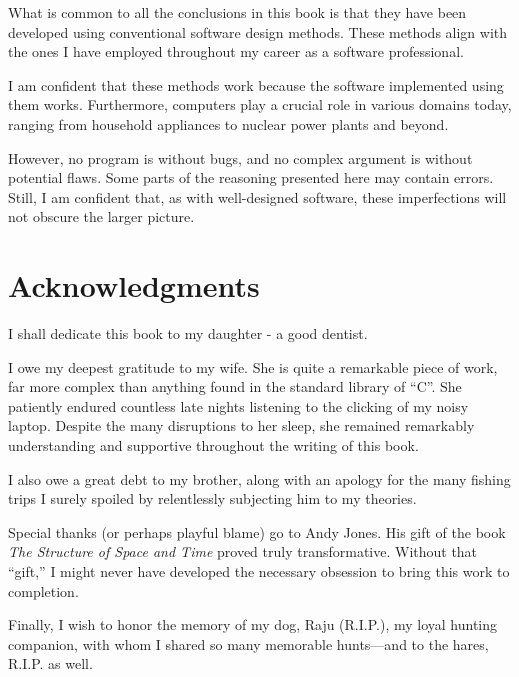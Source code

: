 What is common to all the conclusions in this book is that they have been developed using conventional software design methods.
These methods align with the ones I have employed throughout my career as a software professional.

I am confident that these methods work because the software implemented using them works.
Furthermore, computers play a crucial role in various domains today, ranging from household appliances to nuclear power plants and beyond.

However, no program is without bugs, and no complex argument is without potential flaws.
Some parts of the reasoning presented here may contain errors. Still, I am confident that, as with well-designed software,
these imperfections will not obscure the larger picture.


\section*{Acknowledgments}

I shall dedicate this book to my daughter - a good dentist.

I owe my deepest gratitude to my wife.
She is quite a remarkable piece of work, far more complex than anything found in the standard library of ``C''.
She patiently endured countless late nights listening to the clicking of my noisy laptop.
Despite the many disruptions to her sleep, she remained remarkably understanding and supportive throughout the writing of this book.

I also owe a great debt to my brother, along with an apology for the many fishing trips I surely spoiled by relentlessly subjecting him to my theories.

Special thanks (or perhaps playful blame) go to Andy Jones.
His gift of the book \emph{The Structure of Space and Time} proved truly transformative.
Without that ``gift,'' I might never have developed the necessary obsession to bring this work to completion.

Finally, I wish to honor the memory of my dog, Raju (R.I.P.), my loyal hunting companion, with whom I shared so many memorable hunts---and to the hares, R.I.P. as well.


